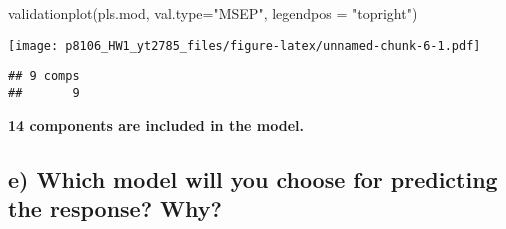 \documentclass[
]{article}
\newenvironment{Shaded}{\begin{snugshade}}{\end{snugshade}}
\newcommand{\AttributeTok}[1]{\textcolor[rgb]{0.77,0.63,0.00}{#1}}
\newcommand{\CommentTok}[1]{\textcolor[rgb]{0.56,0.35,0.01}{\textit{#1}}}
\newcommand{\DecValTok}[1]{\textcolor[rgb]{0.00,0.00,0.81}{#1}}
\newcommand{\FunctionTok}[1]{\textcolor[rgb]{0.00,0.00,0.00}{#1}}
\newcommand{\NormalTok}[1]{#1}
\newcommand{\OtherTok}[1]{\textcolor[rgb]{0.56,0.35,0.01}{#1}}
\newcommand{\SpecialCharTok}[1]{\textcolor[rgb]{0.00,0.00,0.00}{#1}}
\newcommand{\StringTok}[1]{\textcolor[rgb]{0.31,0.60,0.02}{#1}}
\begin{document}
\begin{Shaded}
\begin{Highlighting}[]
\FunctionTok{validationplot}\NormalTok{(pls.mod, }\AttributeTok{val.type=}\StringTok{"MSEP"}\NormalTok{, }\AttributeTok{legendpos =} \StringTok{"topright"}\NormalTok{)}
\end{Highlighting}
\end{Shaded}

\texttt{[image: p8106\_HW1\_yt2785\_files/figure-latex/unnamed-chunk-6-1.pdf]}

\begin{Shaded}
\end{Shaded}

\begin{verbatim}
## 9 comps 
##       9
\end{verbatim}

\begin{Shaded}
\end{Shaded}

\textbf{14 components are included in the model.}

\hypertarget{e-which-model-will-you-choose-for-predicting-the-response-why}{%
\subsection{e) Which model will you choose for predicting the response?
Why?}\label{e-which-model-will-you-choose-for-predicting-the-response-why}}
\end{document}

